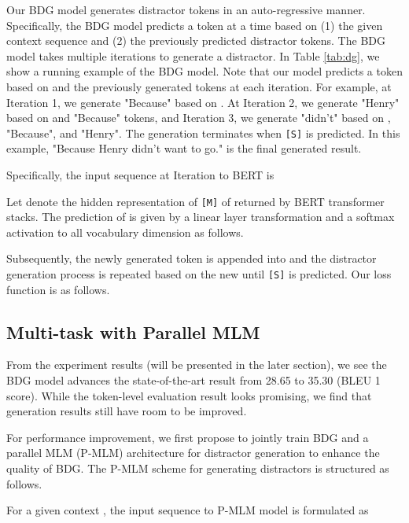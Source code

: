 \documentclass[11pt,a4paper]{article}
\begin{document}
Our BDG model generates distractor tokens in an auto-regressive manner. Specifically, the BDG model predicts a token at a time based on (1) the given context sequence  and (2) the previously predicted distractor tokens. The BDG model takes multiple iterations to generate a distractor. In Table \ref{tab:dg}, we show a running example of the BDG model. Note that our model predicts a token based on  and the previously generated tokens at each iteration. For example, at Iteration 1, we generate "Because" based on . At Iteration 2, we generate "Henry" based on  and "Because" tokens, and Iteration 3, we generate "didn't" based on , "Because", and "Henry". The generation terminates when \texttt{[S]} is predicted. In this example, "Because Henry didn't want to go." is the final generated result. 

Specifically, the input sequence  at Iteration  to BERT is 

Let  denote the hidden representation of \texttt{[M]} of  returned by BERT transformer stacks. The prediction of  is given by a linear layer transformation  and a softmax activation to all vocabulary dimension as follows.  
 






Subsequently, the newly generated token  is appended into  and the distractor generation process is repeated based on the new  until \texttt{[S]} is predicted. Our loss function is as follows.






\subsection{Multi-task with Parallel MLM}

From the experiment results (will be presented in the later section), we see the BDG model advances the state-of-the-art result \cite{zhou2019coattention} from 28.65 to 35.30 (BLEU 1 score). While the token-level evaluation result looks promising, we find that generation results still have room to be improved.

For performance improvement, we first propose to jointly train BDG and a parallel MLM (P-MLM) architecture for distractor generation to enhance the quality of BDG. The P-MLM scheme for generating distractors is structured as follows. 

For a given context , the input sequence  to P-MLM model is formulated as
\end{document}
